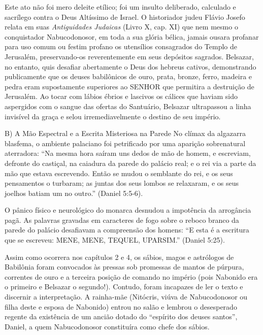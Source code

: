 Este ato não foi mero deleite etílico; foi um insulto deliberado, calculado e sacrílego contra o Deus Altíssimo de Israel. O historiador judeu Flávio Josefo relata em suas \textit{Antiguidades Judaicas} (Livro X, cap. XI) que nem mesmo o conquistador Nabucodonosor, em toda a sua glória bélica, jamais ousara profanar para uso comum ou festim profano os utensílios consagrados do Templo de Jerusalém, preservando-os reverentemente em seus depósitos sagrados. Belsazar, no entanto, quis desafiar abertamente o Deus dos hebreus cativos, demonstrando publicamente que os deuses babilônicos de ouro, prata, bronze, ferro, madeira e pedra eram supostamente superiores ao SENHOR que permitira a destruição de Jerusalém. Ao tocar com lábios ébrios e lascivos os cálices que haviam sido aspergidos com o sangue das ofertas do Santuário, Belsazar ultrapassou a linha invisível da graça e selou irremediavelmente o destino de seu império.

B) A Mão Espectral e a Escrita Misteriosa na Parede
No clímax da algazarra blasfema, o ambiente palaciano foi petrificado por uma aparição sobrenatural aterradora:
``Na mesma hora saíram uns dedos de mão de homem, e escreviam, defronte do castiçal, na caiadura da parede do palácio real; e o rei via a parte da mão que estava escrevendo. Então se mudou o semblante do rei, e os seus pensamentos o turbaram; as juntas dos seus lombos se relaxaram, e os seus joelhos batiam um no outro.'' (Daniel 5:5-6).

O pânico físico e neurológico do monarca desnudou a impotência da arrogância pagã. As palavras gravadas em caracteres de fogo sobre o reboco branco da parede do palácio desafiavam a compreensão dos homens:
``E esta é a escritura que se escreveu: MENE, MENE, TEQUEL, UPARSIM.'' (Daniel 5:25).

Assim como ocorrera nos capítulos 2 e 4, os sábios, magos e astrólogos de Babilônia foram convocados às pressas sob promessas de mantos de púrpura, correntes de ouro e a terceira posição de comando no império (pois Nabonido era o primeiro e Belsazar o segundo!). Contudo, foram incapazes de ler o texto e discernir a interpretação. A rainha-mãe (Nitócris, viúva de Nabucodonosor ou filha deste e esposa de Nabonido) entrou no salão e lembrou o desesperado regente da existência de um ancião dotado do ``espírito dos deuses santos'', Daniel, a quem Nabucodonosor constituíra como chefe dos sábios.

